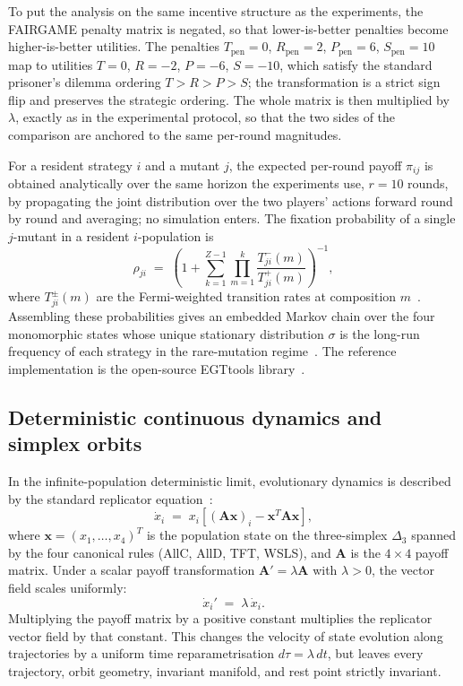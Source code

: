 \documentclass[11pt,a4paper]{article}
\newcommand{\lam}{\lambda}
\begin{document}
To put the analysis on the same incentive structure as the experiments, the FAIRGAME penalty matrix is negated, so that lower-is-better penalties become higher-is-better utilities. The penalties $T_{\text{pen}} = 0$, $R_{\text{pen}} = 2$, $P_{\text{pen}} = 6$, $S_{\text{pen}} = 10$ map to utilities $T = 0$, $R = -2$, $P = -6$, $S = -10$, which satisfy the standard prisoner's dilemma ordering $T > R > P > S$; the transformation is a strict sign flip and preserves the strategic ordering. The whole matrix is then multiplied by $\lam$, exactly as in the experimental protocol, so that the two sides of the comparison are anchored to the same per-round magnitudes.

For a resident strategy $i$ and a mutant $j$, the expected per-round payoff $\pi_{ij}$ is obtained analytically over the same horizon the experiments use, $r = 10$ rounds, by propagating the joint distribution over the two players' actions forward round by round and averaging; no simulation enters. The fixation probability of a single $j$-mutant in a resident $i$-population is
\begin{equation}
\rho_{ji} \;=\; \left(1 + \sum_{k=1}^{Z-1}\prod_{m=1}^{k}
   \frac{T^{-}_{ji}(m)}{T^{+}_{ji}(m)}\right)^{-1},
\label{eq:fixation}
\end{equation}
where $T^{\pm}_{ji}(m)$ are the Fermi-weighted transition rates at composition $m$~\cite{szabo1998evolutionary}. Assembling these probabilities gives an embedded Markov chain over the four monomorphic states whose unique stationary distribution $\sigma$ is the long-run frequency of each strategy in the rare-mutation regime~\cite{sigmund:2010bo}. The reference implementation is the open-source EGTtools library~\cite{domingos2023egttools}.

\subsection{Deterministic continuous dynamics and simplex orbits}\label{appendix:egt_simplex}

In the infinite-population deterministic limit, evolutionary dynamics is described by the standard replicator equation~\cite{sigmund:2010bo,nowak2006five}:
\begin{equation}
\dot{x}_i \;=\; x_i \left[ (\mathbf{A}\mathbf{x})_i - \mathbf{x}^T \mathbf{A} \mathbf{x} \right],
\label{eq:replicator}
\end{equation}
where $\mathbf{x} = (x_1, \dots, x_4)^T$ is the population state on the three-simplex $\Delta_3$ spanned by the four canonical rules (AllC, AllD, TFT, WSLS), and $\mathbf{A}$ is the $4 \times 4$ payoff matrix. Under a scalar payoff transformation $\mathbf{A}' = \lam \mathbf{A}$ with $\lam > 0$, the vector field scales uniformly:
\begin{equation}
\dot{x}_i' \;=\; \lam \, \dot{x}_i.
\label{eq:replicator_scaled}
\end{equation}
Multiplying the payoff matrix by a positive constant multiplies the replicator vector field by that constant. This changes the velocity of state evolution along trajectories by a uniform time reparametrisation $d\tau = \lam \, dt$, but leaves every trajectory, orbit geometry, invariant manifold, and rest point strictly invariant.
\end{document}
